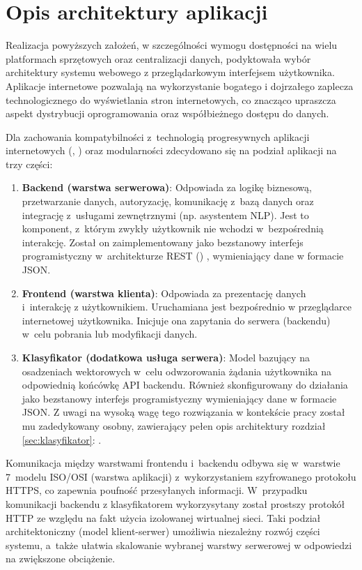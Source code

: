 \section{Opis architektury aplikacji}

Realizacja powyższych założeń, w szczególności wymogu dostępności na wielu platformach sprzętowych oraz centralizacji danych, podyktowała wybór architektury systemu webowego z przeglądarkowym interfejsem użytkownika. Aplikacje internetowe pozwalają na wykorzystanie bogatego i dojrzałego zaplecza technologicznego do wyświetlania stron internetowych, co znacząco upraszcza aspekt dystrybucji oprogramowania oraz współbieżnego dostępu do danych. 

Dla zachowania kompatybilności z~technologią progresywnych aplikacji internetowych (, ) \cite{google_pwa} oraz modularności zdecydowano się na podział aplikacji na trzy części:

\begin{enumerate}
    \item \textbf{Backend (warstwa serwerowa)}: Odpowiada za logikę biznesową, przetwarzanie danych, autoryzację, komunikację z~bazą danych oraz integrację z~usługami zewnętrznymi (np. asystentem NLP). Jest to komponent, z~którym zwykły użytkownik nie wchodzi w~bezpośrednią interakcję. Został on zaimplementowany jako bezstanowy interfejs programistyczny w~architekturze REST () \cite{mdn_rest}, wymieniający dane w formacie JSON.
    \item \textbf{Frontend (warstwa klienta)}: Odpowiada za prezentację danych i~interakcję z użytkownikiem. Uruchamiana jest bezpośrednio w przeglądarce internetowej użytkownika. Inicjuje ona zapytania do serwera (backendu) w~celu pobrania lub modyfikacji danych.
    \item \textbf{Klasyfikator (dodatkowa usługa serwera)}: Model bazujący na osadzeniach wektorowych w~celu odwzorowania żądania użytkownika na odpowiednią końcówkę API backendu. Również skonfigurowany do działania jako bezstanowy interfejs programistyczny wymieniający dane w formacie JSON. Z uwagi na wysoką wagę tego rozwiązania w kontekście pracy został mu zadedykowany osobny, zawierający pełen opis architektury rozdział \ref{sec:klasyfikator}: .
\end{enumerate}

Komunikacja między warstwami frontendu i~backendu odbywa się w~warstwie 7~modelu ISO/\allowbreak{}OSI (warstwa aplikacji) z~wykorzystaniem szyfrowanego protokołu HTTPS, co zapewnia poufność przesyłanych informacji. W~przypadku komunikacji backendu z klasyfikatorem wykorzysytany został prostszy protokół HTTP ze względu na fakt użycia izolowanej wirtualnej sieci. Taki podział architektoniczny (model klient-serwer) umożliwia niezależny rozwój części systemu, a~także ułatwia skalowanie wybranej warstwy serwerowej w odpowiedzi na zwiększone obciążenie.


